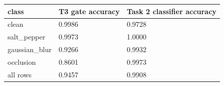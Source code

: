 \begin{tabular}{lll}
\hline
class & T3 gate accuracy & Task 2 classifier accuracy \\
\hline
clean & 0.9986 & 0.9728 \\
salt\_pepper & 0.9973 & 1.0000 \\
gaussian\_blur & 0.9266 & 0.9932 \\
occlusion & 0.8601 & 0.9973 \\
all rows & 0.9457 & 0.9908 \\
\hline
\end{tabular}
